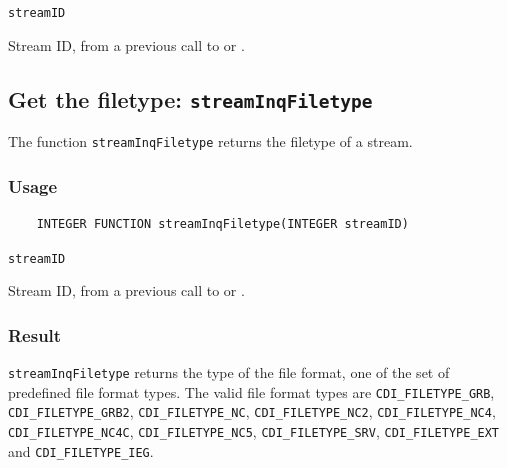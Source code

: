 \hspace*{4mm}\begin{minipage}[]{15cm}
\begin{deflist}{\texttt{streamID}\ }
\item[\texttt{streamID}]
Stream ID, from a previous call to {} or {}.

\end{deflist}
\end{minipage}


\subsection{Get the filetype: \texttt{streamInqFiletype}}
\label{streamInqFiletype}

The function {\texttt{streamInqFiletype}} returns the filetype of a stream.

\subsubsection*{Usage}

\begin{verbatim}
    INTEGER FUNCTION streamInqFiletype(INTEGER streamID)
\end{verbatim}

\hspace*{4mm}\begin{minipage}[]{15cm}
\begin{deflist}{\texttt{streamID}\ }
\item[\texttt{streamID}]
Stream ID, from a previous call to {} or {}.

\end{deflist}
\end{minipage}

\subsubsection*{Result}

{\texttt{streamInqFiletype}} returns the type of the file format,
one of the set of predefined {\CDI} file format types.
The valid {\CDI} file format types are {\texttt{CDI\_FILETYPE\_GRB}}, {\texttt{CDI\_FILETYPE\_GRB2}}, {\texttt{CDI\_FILETYPE\_NC}},
{\texttt{CDI\_FILETYPE\_NC2}},
{\texttt{CDI\_FILETYPE\_NC4}}, {\texttt{CDI\_FILETYPE\_NC4C}}, {\texttt{CDI\_FILETYPE\_NC5}}, {\texttt{CDI\_FILETYPE\_SRV}}, {\texttt{CDI\_FILETYPE\_EXT}} and
{\texttt{CDI\_FILETYPE\_IEG}}.




